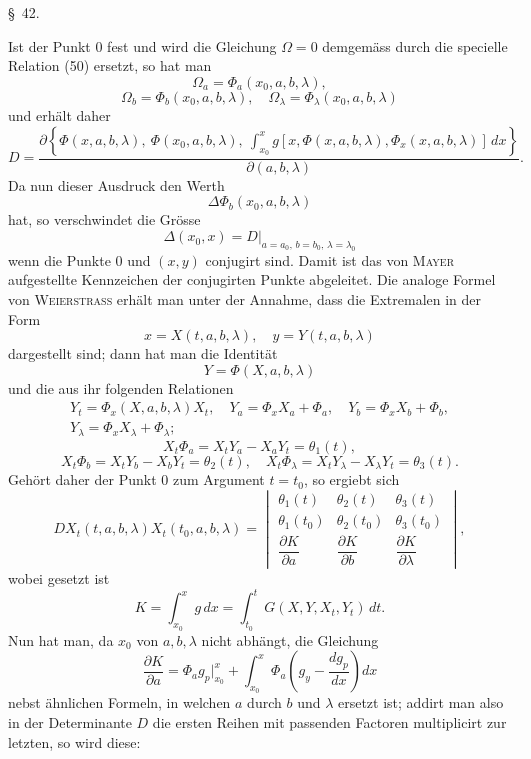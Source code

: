\documentclass[11pt,a4paper,leqno]{article}
\begin{document}
\begin{center}
{\large \S~42.}
\end{center}

Ist der Punkt 0 fest und wird die Gleichung $\Omega=0$ demgemäss durch die specielle Relation (50) ersetzt, so hat man
\[
\Omega_a=\Phi_a(x_0,a,b,\lambda),
\]
\[
\Omega_b=\Phi_b(x_0,a,b,\lambda),
\quad
\Omega_\lambda=\Phi_\lambda(x_0,a,b,\lambda)
\]
und erhält daher
\[
D=\frac{\partial\left\{\Phi(x,a,b,\lambda),\ \Phi(x_0,a,b,\lambda),\ \displaystyle\int_{x_0}^{x}g[x,\Phi(x,a,b,\lambda),\Phi_x(x,a,b,\lambda)]\,dx\right\}}{\partial(a,b,\lambda)}.
\]
Da nun dieser Ausdruck den Werth
\[
\Delta\Phi_b(x_0,a,b,\lambda)
\]
hat, so verschwindet die Grösse
\[
\Delta(x_0,x)=D\big|_{a=a_0,\,b=b_0,\,\lambda=\lambda_0}
\]
wenn die Punkte 0 und $(x,y)$ conjugirt sind. Damit ist das von \textsc{Mayer} aufgestellte Kennzeichen der conjugirten Punkte abgeleitet. Die analoge Formel von \textsc{Weierstrass} erhält man unter der Annahme, dass die Extremalen in der Form
\begin{equation}\tag{57}
x=X(t,a,b,\lambda),
\quad y=Y(t,a,b,\lambda)
\end{equation}
dargestellt sind; dann hat man die Identität
\[
Y=\Phi(X,a,b,\lambda)
\]
und die aus ihr folgenden Relationen
\[
\begin{gathered}
Y_t=\Phi_x(X,a,b,\lambda)X_t,
\quad Y_a=\Phi_xX_a+\Phi_a,
\quad Y_b=\Phi_xX_b+\Phi_b,\\
Y_\lambda=\Phi_xX_\lambda+\Phi_\lambda;
\end{gathered}
\]
\[
X_t\Phi_a=X_tY_a-X_aY_t=\theta_1(t),
\]
\[
X_t\Phi_b=X_tY_b-X_bY_t=\theta_2(t),
\quad
X_t\Phi_\lambda=X_tY_\lambda-X_\lambda Y_t=\theta_3(t).
\]
Gehört daher der Punkt 0 zum Argument $t=t_0$, so ergiebt sich
\[
D X_t(t,a,b,\lambda)X_t(t_0,a,b,\lambda)=
\begin{vmatrix}
\theta_1(t)&\theta_2(t)&\theta_3(t)\\
\theta_1(t_0)&\theta_2(t_0)&\theta_3(t_0)\\[.6ex]
\dfrac{\partial K}{\partial a}&\dfrac{\partial K}{\partial b}&\dfrac{\partial K}{\partial\lambda}
\end{vmatrix},
\]
wobei gesetzt ist
\[
K=\int_{x_0}^{x}g\,dx=\int_{t_0}^{t}G(X,Y,X_t,Y_t)\,dt.
\]
Nun hat man, da $x_0$ von $a,b,\lambda$ nicht abhängt, die Gleichung
\[
\frac{\partial K}{\partial a}=\Phi_a g_p\bigg|_{x_0}^{x}+\int_{x_0}^{x}\Phi_a\left(g_y-\frac{dg_p}{dx}\right)dx
\]
nebst ähnlichen Formeln, in welchen $a$ durch $b$ und $\lambda$ ersetzt ist; addirt man also in der Determinante $D$ die ersten Reihen mit passenden Factoren multiplicirt zur letzten, so wird diese:
\end{document}

